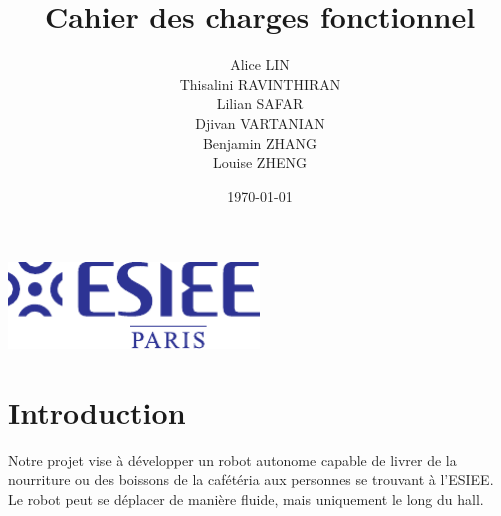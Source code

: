 \documentclass[a4paper,12pt]{report}  %
\title{Cahier des charges fonctionnel}
\author{
	Alice LIN \\
	Thisalini RAVINTHIRAN \\
	Lilian SAFAR \\
	Djivan VARTANIAN \\
	Benjamin ZHANG \\
	Louise ZHENG \\
}
\date{\today}
\begin{document}
	

\begin{titlepage}
\centering
\vspace*{9cm} 
{\LARGE \bfseries \thetitle \par}
\vspace{1cm} 
\large \theauthor \par
\vspace{0.5cm} 
\large \thedate \par
\vspace{4cm} 
\includegraphics[width=0.5\textwidth]{../Design/FichiersPoster/PDF/Logo_ESIEE.pdf} 
\vfill 
\end{titlepage}



%


\tableofcontents

\pagebreak



\section{Introduction}
Notre projet vise à développer un robot autonome capable de livrer de la
nourriture ou des boissons de la cafétéria aux personnes se trouvant à
l'ESIEE. Le robot peut se déplacer de manière fluide, mais uniquement le
long du hall.
\end{document}
